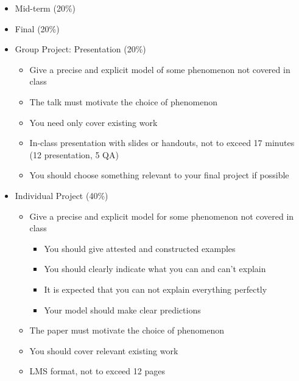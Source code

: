 \documentclass[a4paper,landscape,headrule,footrule]{foils}
\begin{document}
\begin{itemize}
\item Mid-term (20\%)
\item Final (20\%)
\item Group Project: Presentation (20\%) 
  \begin{itemize}
  \item Give a precise and explicit model of some phenomenon not covered in class
  \item The talk must motivate the choice of phenomenon
  \item You need only cover  existing work
  \item In-class presentation with slides or handouts, not to exceed 17 minutes (12 presentation, 5 QA)
  \item You should choose something relevant to your final project if possible
  \end{itemize}
\newpage
\item Individual Project (40\%) 
  \begin{itemize}
  \item Give a precise and explicit model for some phenomenon not covered in class
    \begin{itemize}
    \item You should give attested and constructed examples
    \item You should clearly indicate what you can and can't explain
    \item It is expected that you can not explain everything perfectly
    \item Your model should make clear predictions
    \end{itemize}
  \item The paper must motivate the choice of phenomenon
  \item You should cover relevant existing work 
  \item LMS format, not to exceed 12 pages
  \end{itemize}
\end{itemize}


\end{document}
